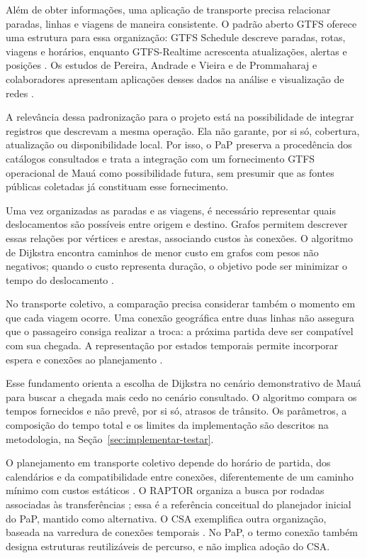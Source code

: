 \documentclass[12pt,oneside,a4paper,brazil,chapter=TITLE]{abntex2}
\begin{document}
Além de obter informações, uma aplicação de transporte precisa relacionar paradas, linhas e viagens de maneira consistente. O padrão aberto GTFS oferece uma estrutura para essa organização: GTFS Schedule descreve paradas, rotas, viagens e horários, enquanto GTFS-Realtime acrescenta atualizações, alertas e posições \citep{gtfs}. Os estudos de Pereira, Andrade e Vieira e de Prommaharaj e colaboradores apresentam aplicações desses dados na análise e visualização de redes \citep{pereira2023,prommaharaj2020}.

A relevância dessa padronização para o projeto está na possibilidade de integrar registros que descrevam a mesma operação. Ela não garante, por si só, cobertura, atualização ou disponibilidade local. Por isso, o PaP preserva a procedência dos catálogos consultados e trata a integração com um fornecimento GTFS operacional de Mauá como possibilidade futura, sem presumir que as fontes públicas coletadas já constituam esse fornecimento.

Uma vez organizadas as paradas e as viagens, é necessário representar quais deslocamentos são possíveis entre origem e destino. Grafos permitem descrever essas relações por vértices e arestas, associando custos às conexões. O algoritmo de Dijkstra encontra caminhos de menor custo em grafos com pesos não negativos; quando o custo representa duração, o objetivo pode ser minimizar o tempo do deslocamento \citep{sedgewicksp}.

No transporte coletivo, a comparação precisa considerar também o momento em que cada viagem ocorre. Uma conexão geográfica entre duas linhas não assegura que o passageiro consiga realizar a troca: a próxima partida deve ser compatível com sua chegada. A representação por estados temporais permite incorporar espera e conexões ao planejamento \citep{transitplanner}.

Esse fundamento orienta a escolha de Dijkstra no cenário demonstrativo de Mauá para buscar a chegada mais cedo no cenário consultado. O algoritmo compara os tempos fornecidos e não prevê, por si só, atrasos de trânsito. Os parâmetros, a composição do tempo total e os limites da implementação são descritos na metodologia, na Seção~\ref{sec:implementar-testar}.

O planejamento em transporte coletivo depende do horário de partida, dos calendários e da compatibilidade entre conexões, diferentemente de um caminho mínimo com custos estáticos \citep{dijkstra1959,bast2015}. O RAPTOR organiza a busca por rodadas associadas às transferências \citep{delling2012}; essa é a referência conceitual do planejador inicial do PaP, mantido como alternativa. O CSA exemplifica outra organização, baseada na varredura de conexões temporais \citep{dibbelt2018}. No PaP, o termo conexão também designa estruturas reutilizáveis de percurso, e não implica adoção do CSA.
\end{document}
